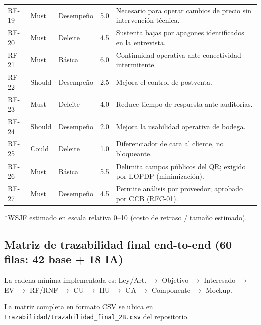 \documentclass[11pt,a4paper]{article}
\begin{document}
\begin{longtable}{|p{1.3cm}|p{1.8cm}|p{2.2cm}|p{1.6cm}|p{7.5cm}|}
RF-19 & Must & Desempeño & 5.0 & Necesario para operar cambios de precio sin intervención técnica. \\
RF-20 & Must & Deleite & 4.5 & Sustenta bajas por apagones identificados en la entrevista. \\
RF-21 & Must & Básica & 6.0 & Continuidad operativa ante conectividad intermitente. \\
RF-22 & Should & Desempeño & 2.5 & Mejora el control de postventa. \\
RF-23 & Must & Deleite & 4.0 & Reduce tiempo de respuesta ante auditorías. \\
RF-24 & Should & Desempeño & 2.0 & Mejora la usabilidad operativa de bodega. \\
RF-25 & Could & Deleite & 1.0 & Diferenciador de cara al cliente, no bloqueante. \\
RF-26 & Must & Básica & 5.5 & Delimita campos públicos del QR; exigido por LOPDP (minimización). \\
RF-27 & Must & Desempeño & 4.5 & Permite análisis por proveedor; aprobado por CCB (RFC-01). \\
\hline
\end{longtable}
\footnotesize{*WSJF estimado en escala relativa 0--10 (costo de retraso / tamaño estimado).}

\subsection{Matriz de trazabilidad final end-to-end (60 filas: 42 base + 18 IA)}

La cadena mínima implementada es: Ley/Art. $\to$ Objetivo $\to$ Interesado $\to$ EV $\to$ RF/RNF $\to$ CU $\to$ HU $\to$ CA $\to$ Componente $\to$ Mockup.

La matriz completa en formato CSV se ubica en \texttt{trazabilidad/trazabilidad\_final\_2B.csv} del repositorio.
\end{document}

